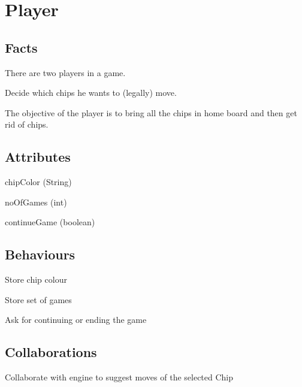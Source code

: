 \section{Player}

\subsection{Facts}

\begin{dashed}
    \item There are two players in a game.
    \item Decide which chips he wants to (legally) move.
    \item The objective of the player is to bring all the chips in home board and then get rid of chips.
\end{dashed}

\subsection{Attributes}

\begin{dashed}
    \item chipColor (String)
    \item noOfGames (int)
    \item continueGame (boolean)
\end{dashed}

\subsection{Behaviours}

\begin{dashed}
    \item Store chip colour
    \item Store set of games
    \item Ask for continuing or ending the game
\end{dashed}

\subsection{Collaborations}

\begin{dashed}
    \item Collaborate with engine to suggest moves of the selected Chip
\end{dashed}


